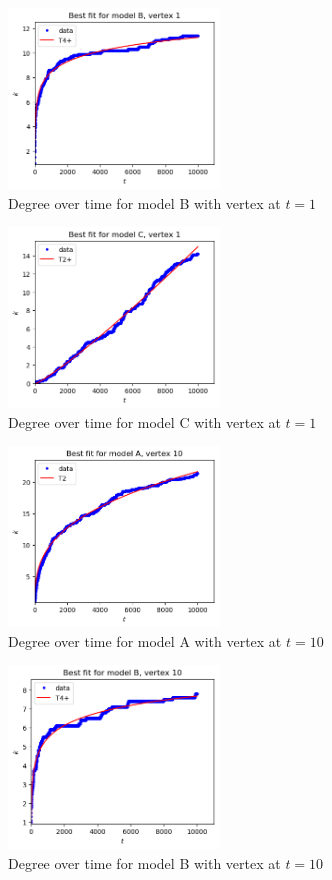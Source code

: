 \documentclass[a4paper]{article}
\begin{document}
%
\begin{figure}[H]
    \centering
		\includegraphics[width=0.5\textwidth]{modelB/best_dt1.png}
		\caption{Degree over time for model B with vertex at $t=1$}
\end{figure}
%
\begin{figure}[H]
		\centering
		\includegraphics[width=0.5\textwidth]{modelC/best_dt1.png}
		\caption{Degree over time for model C with vertex at $t=1$}
\end{figure}
%
\begin{figure}[H]
    \centering
		\includegraphics[width=0.5\textwidth]{modelA/best_dt10.png}
		\caption{Degree over time for model A with vertex at $t=10$}
\end{figure}
%
\begin{figure}[H]
    \centering
		\includegraphics[width=0.5\textwidth]{modelB/best_dt10.png}
		\caption{Degree over time for model B with vertex at $t=10$}
\end{figure}
\end{document}
